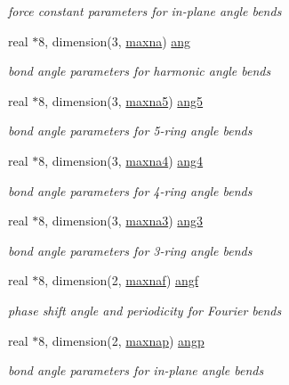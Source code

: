 \begin{DoxyCompactItemize}
\begin{DoxyCompactList}\small\item\em force constant parameters for in-\/plane angle bends \end{DoxyCompactList}\item 
real $\ast$8, dimension(3, \hyperlink{classkangs_a219b9491df85352c42fb06b082f1fce2}{maxna}) \hyperlink{classkangs_a23c8d00fd92495d816a68a4a1d952282}{ang}
\begin{DoxyCompactList}\small\item\em bond angle parameters for harmonic angle bends \end{DoxyCompactList}\item 
real $\ast$8, dimension(3, \hyperlink{classkangs_af188b59476d50504dd8aa39359285894}{maxna5}) \hyperlink{classkangs_a4577e70383dba9f6dd8ab2d98463f2b1}{ang5}
\begin{DoxyCompactList}\small\item\em bond angle parameters for 5-\/ring angle bends \end{DoxyCompactList}\item 
real $\ast$8, dimension(3, \hyperlink{classkangs_a65b59f16cd39d33f1686bf32e362e6c9}{maxna4}) \hyperlink{classkangs_a88c492e1327f859f7873b031372b16fe}{ang4}
\begin{DoxyCompactList}\small\item\em bond angle parameters for 4-\/ring angle bends \end{DoxyCompactList}\item 
real $\ast$8, dimension(3, \hyperlink{classkangs_a121c0c19e92533f59e8c9b276e200da5}{maxna3}) \hyperlink{classkangs_a8eeaafcb58d09511629476c3cd84baaa}{ang3}
\begin{DoxyCompactList}\small\item\em bond angle parameters for 3-\/ring angle bends \end{DoxyCompactList}\item 
real $\ast$8, dimension(2, \hyperlink{classkangs_a3f749f34ae8245564a10206341a2dbdd}{maxnaf}) \hyperlink{classkangs_a5b22b5bf50f74dcdacb6d24965ef5a33}{angf}
\begin{DoxyCompactList}\small\item\em phase shift angle and periodicity for Fourier bends \end{DoxyCompactList}\item 
real $\ast$8, dimension(2, \hyperlink{classkangs_aaa36915cbec793691849f7f04c409e24}{maxnap}) \hyperlink{classkangs_a58286983ac9fbb4b1b314d852757211f}{angp}
\begin{DoxyCompactList}\small\item\em bond angle parameters for in-\/plane angle bends \end{DoxyCompactList}\item 

\end{DoxyCompactItemize}
